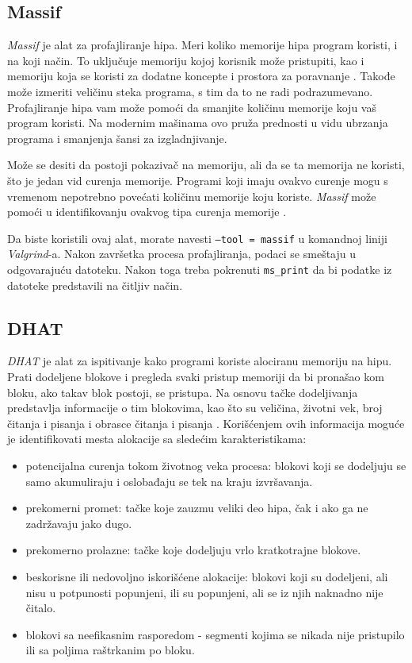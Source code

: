 \documentclass[12pt,oneside]{memoir}
\theoremstyle{plain}
\theoremstyle{definition}
\begin{document}
\subsection{Massif}

\textit{Massif} je alat za profajliranje hipa. Meri koliko memorije hipa program koristi, i na koji način. To uključuje memoriju kojoj korisnik može pristupiti, kao i memoriju koja se koristi za dodatne koncepte i prostora za poravnanje \cite{Massif}. Takođe može izmeriti veličinu steka  programa, s tim da to ne radi podrazumevano. Profajliranje hipa vam može pomoći da smanjite količinu memorije koju vaš program koristi. Na modernim mašinama ovo pruža prednosti u vidu ubrzanja programa i smanjenja šansi za izgladnjivanje.

Može se desiti da postoji pokazivač na memoriju, ali da se ta memorija ne koristi, što je jedan vid curenja memorije. Programi koji imaju ovakvo curenje mogu s vremenom nepotrebno povećati količinu memorije koju koriste. \textit{Massif} može pomoći u identifikovanju ovakvog tipa curenja memorije \cite{Massif}.

Da biste koristili ovaj alat, morate navesti \texttt{--tool = massif} u komandnoj liniji \textit{Valgrind}-a. Nakon završetka procesa profajliranja, podaci se smeštaju u odgovarajuću datoteku. Nakon toga treba pokrenuti \texttt{ms\_print} da bi podatke iz datoteke predstavili na čitljiv način. 

\subsection{DHAT}

\textit{DHAT} je alat za ispitivanje kako programi koriste alociranu memoriju na hipu. Prati dodeljene blokove i pregleda svaki pristup memoriji da bi pronašao kom bloku, ako takav blok postoji, se pristupa. Na osnovu tačke dodeljivanja predstavlja informacije o tim blokovima, kao što su veličina, životni vek, broj čitanja i pisanja i obrasce čitanja i pisanja \cite{DHAT}. Korišćenjem ovih informacija moguće je identifikovati mesta alokacije sa sledećim karakteristikama:
\begin{itemize}
\item potencijalna curenja tokom životnog veka procesa: blokovi koji se dodeljuju se samo akumuliraju i oslobađaju se tek na kraju izvršavanja.
\item prekomerni promet: tačke koje zauzmu veliki deo hipa, čak i ako ga ne zadržavaju jako dugo.
\item prekomerno prolazne: tačke koje dodeljuju vrlo kratkotrajne blokove.
\item beskorisne ili nedovoljno iskorišćene alokacije: blokovi koji su dodeljeni, ali nisu u potpunosti popunjeni, ili su popunjeni, ali se iz njih naknadno nije čitalo.
\item blokovi sa neefikasnim rasporedom - segmenti kojima se nikada nije pristupilo ili sa poljima raštrkanim po bloku.
\end{itemize}
\end{document}

